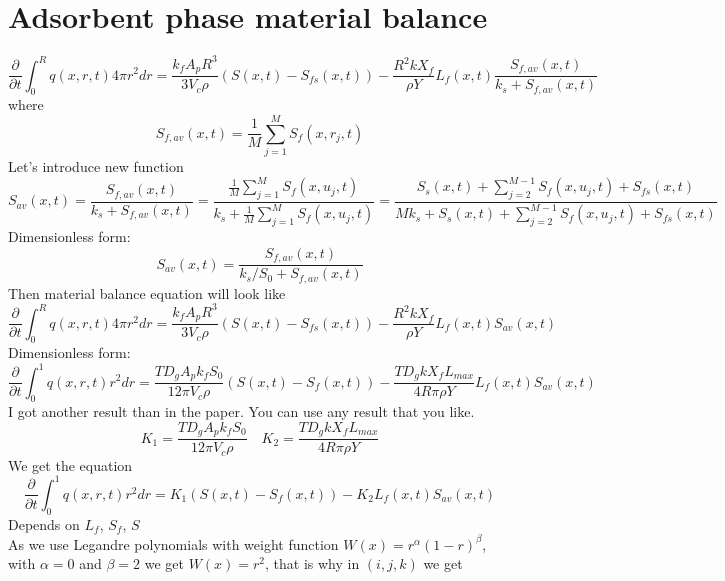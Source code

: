 \documentclass[12pt]{article}
\begin{document}
\section{Adsorbent phase material balance}
\begin{equation}
\frac{\partial}{\partial t} \int_{0}^{R}q(x,r,t)4\pi r^2dr=
\frac{k_fA_pR^3}{3V_c\rho}(S(x,t)-S_{fs}(x,t))-\frac{R^2kX_f}{\rho Y}L_f(x,t)\frac{S_{f,av}(x,t)}{k_s+S_{f,av}(x,t)}
\end{equation}
where 
\begin{equation}
S_{f,av}(x,t) = \frac{1}{M}\sum_{j=1}^{M}S_f(x, r_j, t)
\end{equation}
Let's introduce new function
\begin{equation}\label{eq:S_av}
S_{av}(x,t) = \frac{S_{f,av}(x,t)}{k_s+S_{f,av}(x,t)} = 
\frac{\frac{1}{M}\sum_{j=1}^{M}S_f(x, u_j, t)}{k_s+\frac{1}{M}\sum_{j=1}^{M}S_f(x, u_j, t)}=
\frac{S_s(x, t)+\sum_{j=2}^{M-1}S_f(x, u_j, t)+S_{fs}(x, t)}{Mk_s+S_s(x, t)+\sum_{j=2}^{M-1}S_f(x, u_j, t)+S_{fs}(x, t)}
\end{equation}
Dimensionless form:
\begin{equation}\label{eq:S_avLess}
S_{av}(x,t) = \frac{S_{f,av}(x,t)}{k_s/S_0+S_{f,av}(x,t)}
\end{equation}
Then material balance equation will look like
\begin{equation}
\frac{\partial}{\partial t} \int_{0}^{R}q(x,r,t)4\pi r^2dr=
\frac{k_fA_pR^3}{3V_c\rho}(S(x,t)-S_{fs}(x,t))-\frac{R^2kX_f}{\rho Y}L_f(x,t)S_{av}(x,t)
\end{equation}
Dimensionless form:
\begin{equation}
\frac{\partial}{\partial t} \int_{0}^{1}q(x,r,t)r^2dr={\frac{T D_gA_pk_fS_0}{12\pi V_c \rho}}(S(x,t)-S_f(x,t))-{\frac{TD_gkX_fL_{max}}{4R\pi \rho Y}}L_f(x,t)S_{av}(x,t)
\end{equation}
I got another result than in the paper. You can use any result that you like.
\begin{equation}
K_1=\frac{T D_gA_pk_fS_0}{12\pi V_c \rho}
\quad
K_2=\frac{TD_gkX_fL_{max}}{4R\pi \rho Y}
\end{equation}
We get the equation
\begin{equation}
\frac{\partial}{\partial t} \int_{0}^{1}q(x,r,t)r^2dr=K_1(S(x,t)-S_f(x,t))-K_2L_f(x,t)S_{av}(x,t)
\end{equation}
Depends on $L_f$, $S_f$, $S$\\
As we use Legandre polynomials with weight function $W(x) =r^\alpha(1-r)^\beta$, with $\alpha = 0$ and $\beta = 2$ we get $W(x) = r^2$, that is why in $(i, j, k)$ we get
\end{document}
